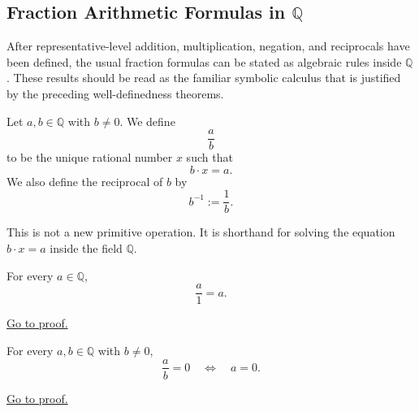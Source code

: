 
\subsection{Fraction Arithmetic Formulas in $\mathbb{Q}$}
\label{sec:fraction-arithmetic-formulas-q}

After representative-level addition, multiplication, negation, and reciprocals have been defined, the usual fraction formulas can be stated as algebraic rules inside $\mathbb{Q}$.  These results should be read as the familiar symbolic calculus that is justified by the preceding well-definedness theorems.

\begin{definition}
\label{def:rational-division}
Let $a,b\in \mathbb{Q}$ with $b\neq 0$. We define
\[
\frac{a}{b}
\]
to be the unique rational number $x$ such that
\[
b\cdot x=a.
\]
We also define the reciprocal of $b$ by
\[
b^{-1}:=\frac{1}{b}.
\]
\end{definition}

\begin{remark}
This is not a new primitive operation. It is shorthand for solving the
equation $b\cdot x=a$ inside the field $\mathbb{Q}$.
\end{remark}

\begin{theorem}
\label{thm:rational-division-by-one}
For every $a\in\mathbb{Q}$,
\[
\frac{a}{1}=a.
\]
\end{theorem}

\begin{remark*}[Proof]
\hyperref[prf:rational-division-by-one]{Go to proof.}
\end{remark*}

\begin{theorem}
\label{thm:rational-quotient-zero-iff-numerator-zero}
For every $a,b\in\mathbb{Q}$ with $b\neq 0$,
\[
\frac{a}{b}=0
\quad\Longleftrightarrow\quad
a=0.
\]
\end{theorem}

\begin{remark*}[Proof]
\hyperref[prf:rational-quotient-zero-iff-numerator-zero]{Go to proof.}
\end{remark*}

